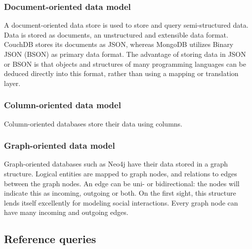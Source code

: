 \subsubsection{Document-oriented data model}
\label{sec:document-data-model}

A document-oriented data store is used to store and query semi-structured data. Data is stored as documents, an unstructured and extensible data format. CouchDB stores its documents as JSON, whereas MongoDB utilizes Binary JSON (BSON) as primary data format. The advantage of storing data in JSON or BSON is that objects and structures of many programming languages can be deduced directly into this format, rather than using a mapping or translation layer.

\subsubsection{Column-oriented data model}
\label{sec:column-data-model}

Column-oriented databases store their data using columns.

\subsubsection{Graph-oriented data model}
\label{sec:graph-data-model}

Graph-oriented databases such as Neo4j have their data stored in a graph structure. Logical entities are mapped to graph nodes, and relations to edges between the graph nodes. An edge can be uni- or bidirectional: the nodes will indicate this as incoming, outgoing or both.
On the first sight, this structure lends itself excellently for modeling social interactions. Every graph node can have many incoming and outgoing edges.

\subsection{Reference queries}
\label{sec:reference-queries}

